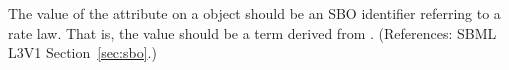 The value of the  attribute on a \KineticLaw object should
be an SBO identifier referring to a rate law.  That is, the value should be
a term derived from \sboratelaw.  (References: SBML L3V1
Section~\ref{sec:sbo}.)
